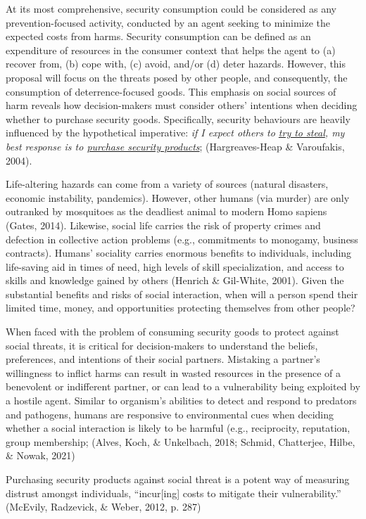 \documentclass[
  english,
  man]{apa6}
\begin{document}
At its most comprehensive, security consumption could be considered as any prevention-focused activity, conducted by an agent seeking to minimize the expected costs from harms. Security consumption can be defined as an expenditure of resources in the consumer context that helps the agent to (a) recover from, (b) cope with, (c) avoid, and/or (d) deter hazards. However, this proposal will focus on the threats posed by other people, and consequently, the consumption of deterrence-focused goods. This emphasis on social sources of harm reveals how decision-makers must consider others' intentions when deciding whether to purchase security goods. Specifically, security behaviours are heavily influenced by the hypothetical imperative: \emph{if I expect others to \underline{try to steal}, my best response is to \underline{purchase security products}}; (Hargreaves-Heap \& Varoufakis, 2004).

Life-altering hazards can come from a variety of sources (natural disasters, economic instability, pandemics). However, other humans (via murder) are only outranked by mosquitoes as the deadliest animal to modern Homo sapiens (Gates, 2014). Likewise, social life carries the risk of property crimes and defection in collective action problems (e.g., commitments to monogamy, business contracts). Humans' sociality carries enormous benefits to individuals, including life-saving aid in times of need, high levels of skill specialization, and access to skills and knowledge gained by others (Henrich \& Gil-White, 2001). Given the substantial benefits and risks of social interaction, when will a person spend their limited time, money, and opportunities protecting themselves from other people?

When faced with the problem of consuming security goods to protect against social threats, it is critical for decision-makers to understand the beliefs, preferences, and intentions of their social partners. Mistaking a partner's willingness to inflict harms can result in wasted resources in the presence of a benevolent or indifferent partner, or can lead to a vulnerability being exploited by a hostile agent. Similar to organism's abilities to detect and respond to predators and pathogens, humans are responsive to environmental cues when deciding whether a social interaction is likely to be harmful (e.g., reciprocity, reputation, group membership; (Alves, Koch, \& Unkelbach, 2018; Schmid, Chatterjee, Hilbe, \& Nowak, 2021)

Purchasing security products against social threat is a potent way of measuring distrust amongst individuals, ``incur{[}ing{]} costs to mitigate their vulnerability.'' (McEvily, Radzevick, \& Weber, 2012, p. 287)
\end{document}
